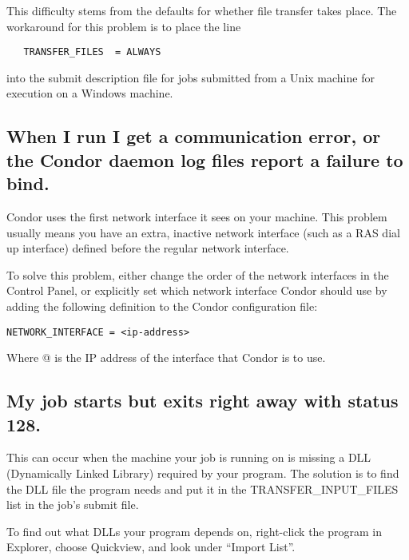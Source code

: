 This difficulty stems from the defaults for whether file transfer
takes place.
The workaround for this problem is to place the line
\begin{verbatim}
   TRANSFER_FILES  = ALWAYS
\end{verbatim}
into the submit description file for jobs submitted from a Unix
machine for execution on a Windows machine.


\subsection*{When I run  I get a communication error, or the Condor daemon log files report a failure to bind.}

Condor uses the first network interface it sees on your machine.
This problem usually means you have an extra, inactive network
interface (such as a RAS dial up interface) defined before the
regular network interface.

To solve this problem, either change the order of the network
interfaces in the Control Panel, or explicitly set which network
interface Condor should use by adding the following definition to the
Condor configuration file:

\begin{verbatim}
NETWORK_INTERFACE = <ip-address>
\end{verbatim}

Where @ is the IP address of the interface that
Condor is to use.

\subsection*{My job starts but exits right away with status 128.}

This can occur when the machine your job is running on is missing a
DLL (Dynamically Linked Library) required by your program.
The solution is to find the DLL file the program needs and put it in
the TRANSFER\_INPUT\_FILES list in the job's submit file.

To find out what DLLs your program depends on, right-click the program
in Explorer, choose Quickview, and look under ``Import List''.


